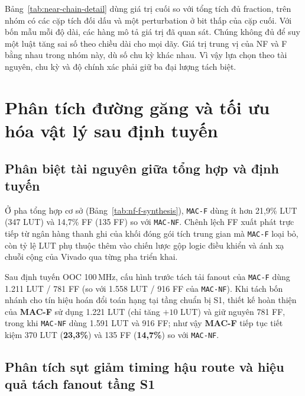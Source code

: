 Bảng~\ref{tab:near-chain-detail} dùng giá trị cuối so với
tổng tích đủ fraction, trên nhóm có các cặp tích đối dấu
và một perturbation ở bit thấp của cặp cuối. Với bốn mẫu
mỗi độ dài, các hàng mô tả giá trị đã quan sát. Chúng không
đủ để suy một luật tăng sai số theo chiều dài cho mọi dãy.
Giá trị trung vị của NF và F bằng nhau trong nhóm này,
dù số chu kỳ khác nhau. Vì vậy lựa chọn theo tài nguyên,
chu kỳ và độ chính xác phải giữ ba đại lượng tách biệt.

\section{Phân tích đường găng và tối ưu hóa vật lý sau định tuyến}

\subsection{Phân biệt tài nguyên giữa tổng hợp và định tuyến}

Ở pha tổng hợp cơ sở (Bảng~\ref{tab:nf-f-synthesis}), \texttt{MAC-F} dùng ít
hơn 21,9\% LUT (347 LUT) và 14,7\% FF (135 FF) so với \texttt{MAC-NF}. Chênh
lệch FF xuất phát trực tiếp từ ngân hàng thanh ghi của khối đóng gói tích trung
gian mà \texttt{MAC-F} loại bỏ, còn tỷ lệ LUT phụ thuộc thêm vào chiến lược gộp
logic điều khiển và ánh xạ chuỗi cộng của Vivado qua từng pha triển khai.

Sau định tuyến OOC 100\,MHz, cấu hình trước tách tải fanout của \texttt{MAC-F}
dùng 1.211 LUT / 781 FF (so với 1.558 LUT / 916 FF của \texttt{MAC-NF}). Khi
tách bốn nhánh cho tín hiệu hoán đổi toán hạng tại tầng chuẩn bị S1, thiết kế
hoàn thiện của \textbf{MAC-F} sử dụng 1.221 LUT (chỉ tăng $+10$ LUT) và giữ nguyên
781 FF, trong khi \texttt{MAC-NF} dùng 1.591 LUT và 916 FF; như vậy \textbf{MAC-F}
tiếp tục tiết kiệm 370 LUT (\textbf{23,3\%}) và 135 FF (\textbf{14,7\%}) so với \texttt{MAC-NF}.

\subsection{Phân tích sụt giảm timing hậu route và hiệu quả tách fanout tầng S1}

